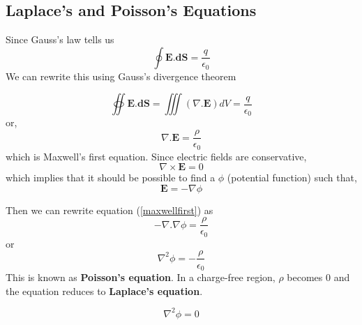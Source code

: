 \documentclass{article}
\begin{document}
	\subsection{Laplace's and Poisson's Equations}
		Since Gauss's law tells us
		$$ \oint \textbf{E}.\textbf{dS} = \frac{q}{\epsilon_0} $$
		We can rewrite this using Gauss's divergence theorem
		
		$$ \oiint \textbf{E}.\textbf{dS} = \iiint (\nabla . \textbf{E})dV = \frac{q}{\epsilon_0}$$
		or,
		\begin{equation}
		\label{maxwellfirst}
		\nabla . \textbf{E} = \frac{\rho}{\epsilon_0}
		\end{equation}
		which is Maxwell's first equation. Since electric fields are conservative,
		$$ \nabla \times \textbf{E} = 0 $$
		which implies that it should be possible to find a $\phi$ (potential function) such that,
		$$ \textbf{E} = -\nabla\phi $$
		
		Then we can rewrite equation (\ref{maxwellfirst}) as
		$$ - \nabla . \nabla\phi = \frac{\rho}{\epsilon_0}$$
		or
		$$\boxed{\nabla^2\phi = -\frac{\rho}{\epsilon_0}}$$
		This is known as \textbf{Poisson's equation}. In a charge-free region, $\rho$ becomes 0 and the equation reduces to \textbf{Laplace's equation}.
		
		$$\boxed{\nabla^2\phi = 0}$$
		
\end{document}
